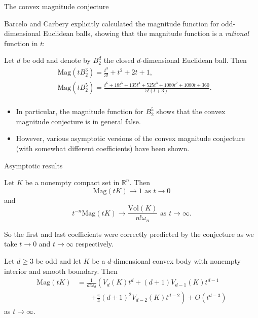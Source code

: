 \documentclass[12pt,mathserif]{beamer}
\begin{document}
\begin{frame}[allowframebreaks]{The convex magnitude conjecture}
\framebreak

Barcelo and Carbery explicitly calculated the magnitude function for odd-dimensional Euclidean balls, showing that the magnitude function is a \emph{rational} function in $t$:

\begin{theorem}
Let $d$ be odd and denote by $B_2^d$ the closed $d$-dimensional Euclidean ball. Then
\begin{align*}\label{eqn:explicitmagfuns}
&\text{Mag}\left(tB_2^3\right) = \frac{t^3}{3!}+t^2+2t+1, \\
&\text{Mag}\left(tB_2^5\right) = \frac{t^6+18t^5+135t^4+525t^3+1080t^2+1080t+360}{5!(t+3)}. \\
\end{align*}
\end{theorem}

\begin{itemize}
\item In particular, the magnitude function for $B_2^5$ shows that the convex magnitude conjecture is in general false.
\item However, various asymptotic versions of the convex magnitude conjecture (with somewhat different coefficients) have been shown.
\end{itemize}

\end{frame}

\begin{frame}[allowframebreaks]{Asymptotic results}

\begin{theorem}\label{thm:BCasymp}
Let $K$ be a nonempty compact set in $\mathbb{R}^n$. Then
\begin{equation*}
\text{Mag}(tK) \to 1 \text{ as $t\to0$}
\end{equation*}
and
\begin{equation*}
t^{-n}\text{Mag}(tK) \to \frac{\text{Vol}(K)}{n!\omega_n} \text{ as $t\to\infty$.}
\end{equation*}
\end{theorem}
So the first and last coefficients were correctly predicted by the conjecture as we take $t\to0$ and $t\to\infty$ respectively.

\framebreak

\begin{theorem}
Let $d\geq3$ be odd and let $K$ be a $d$-dimensional convex body with nonempty interior and smooth boundary. Then
\begin{align*}
\text{Mag}(tK) &= \frac{1}{d!\omega_d}\left(V_d(K)t^d+(d+1)V_{d-1}(K)t^{d-1}\right. \\
&\qquad \left.+\frac{\pi}{4}(d+1)^2V_{d-2}(K)t^{d-2}\right)+O\left(t^{d-3}\right)
\end{align*}
as $t\to\infty$.
\end{theorem}
\end{frame}
\end{document}
